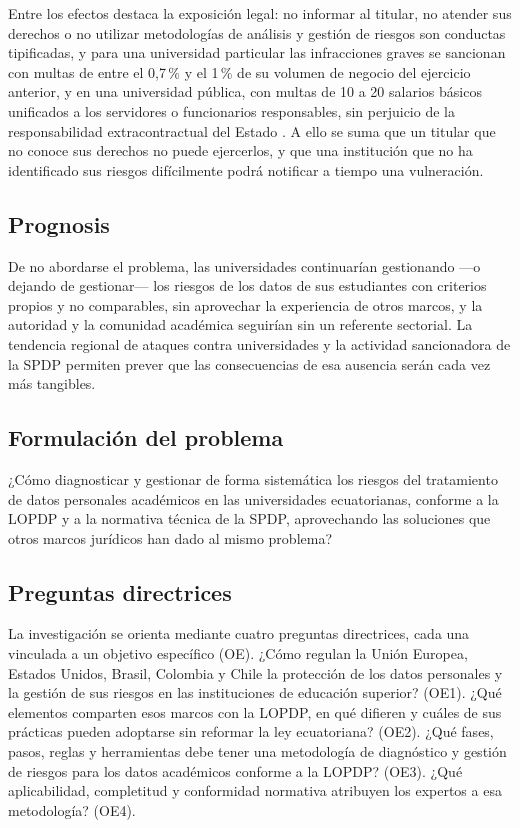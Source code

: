 Entre los efectos destaca la exposición legal: no informar al titular, no atender sus derechos o no utilizar metodologías de análisis y gestión de riesgos son conductas tipificadas, y para una universidad particular las infracciones graves se sancionan con multas de entre el 0,7\,\% y el 1\,\% de su volumen de negocio del ejercicio anterior, y en una universidad pública, con multas de 10 a 20 salarios básicos unificados a los servidores o funcionarios responsables, sin perjuicio de la responsabilidad extracontractual del Estado \cite[arts.~68 y 72]{lopdp2021}. A ello se suma que un titular que no conoce sus derechos no puede ejercerlos, y que una institución que no ha identificado sus riesgos difícilmente podrá notificar a tiempo una vulneración.

\subsection{Prognosis}

De no abordarse el problema, las universidades continuarían gestionando ---o dejando de gestionar--- los riesgos de los datos de sus estudiantes con criterios propios y no comparables, sin aprovechar la experiencia de otros marcos, y la autoridad y la comunidad académica seguirían sin un referente sectorial. La tendencia regional de ataques contra universidades \cite{cnnchile2024usm,semana2023unal,sophos2024education} y la actividad sancionadora de la SPDP \cite{revelo2025sanciones} permiten prever que las consecuencias de esa ausencia serán cada vez más tangibles.

\subsection{Formulación del problema}

¿Cómo diagnosticar y gestionar de forma sistemática los riesgos del tratamiento de datos personales académicos en las universidades ecuatorianas, conforme a la LOPDP y a la normativa técnica de la SPDP, aprovechando las soluciones que otros marcos jurídicos han dado al mismo problema?

\subsection{Preguntas directrices}

La investigación se orienta mediante cuatro preguntas directrices, cada una vinculada a un objetivo específico (OE). ¿Cómo regulan la Unión Europea, Estados Unidos, Brasil, Colombia y Chile la protección de los datos personales y la gestión de sus riesgos en las instituciones de educación superior? (OE1). ¿Qué elementos comparten esos marcos con la LOPDP, en qué difieren y cuáles de sus prácticas pueden adoptarse sin reformar la ley ecuatoriana? (OE2). ¿Qué fases, pasos, reglas y herramientas debe tener una metodología de diagnóstico y gestión de riesgos para los datos académicos conforme a la LOPDP? (OE3). ¿Qué aplicabilidad, completitud y conformidad normativa atribuyen los expertos a esa metodología? (OE4).

